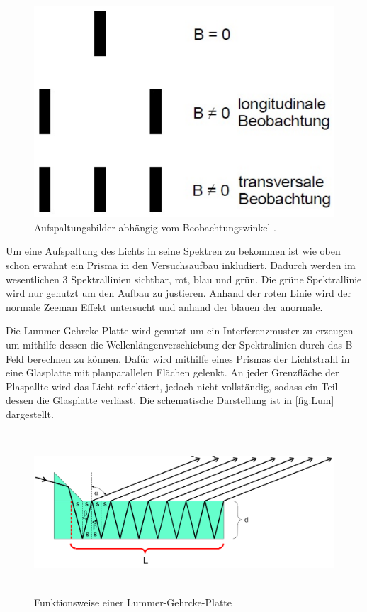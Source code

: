 \vspace{-5pt}
\begin{figure}[H]
    \centering
    \includegraphics[scale=0.2]{polarisation.png}
    \vspace{-10pt}
    \vspace{3pt}
    \caption{Aufspaltungsbilder abhängig vom Beobachtungswinkel \cite{V27}.}
    \label{fig:pol}
\end{figure}

\noindent
Um eine Aufspaltung des Lichts in seine Spektren zu bekommen ist wie oben schon erwähnt ein Prisma in den Versuchsaufbau inkludiert. Dadurch werden im wesentlichen 3 Spektrallinien
sichtbar, rot, blau und grün. Die grüne Spektrallinie wird nur genutzt um den Aufbau zu justieren. Anhand der roten Linie wird der normale Zeeman Effekt untersucht und anhand der 
blauen der anormale.  


\noindent
Die Lummer-Gehrcke-Platte wird genutzt um ein Interferenzmuster zu erzeugen um mithilfe dessen die Wellenlängenverschiebung der Spektralinien durch das B-Feld berechnen zu können.
Dafür wird mithilfe eines Prismas der Lichtstrahl in eine Glasplatte mit planparallelen Flächen gelenkt. An jeder Grenzfläche der Plaspallte wird das Licht reflektiert, jedoch nicht
vollständig, sodass ein Teil dessen die Glasplatte verlässt. Die schematische Darstellung ist in \autoref{fig:Lum} dargestellt.

\begin{figure}[H]
  \centering
  \includegraphics[height=6cm]{Lummer.png}
  \caption{Funktionsweise einer Lummer-Gehrcke-Platte \cite{V27}}
  \label{fig:Lum}
\end{figure}

